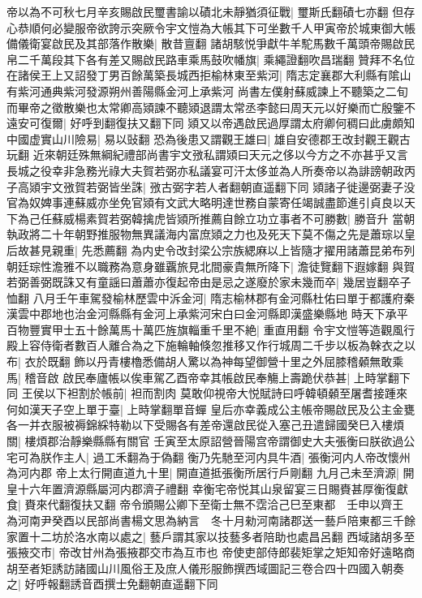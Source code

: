 帝以為不可秋七月辛亥賜啟民璽書諭以磧北未靜猶須征戰|{
	璽斯氏翻磧七亦翻}
但存心恭順何必變服帝欲誇示突厥令宇文愷為大帳其下可坐數千人甲寅帝於城東御大帳備儀衛宴啟民及其部落作散樂|{
	散昔亶翻}
諸胡駭悦爭獻牛羊駝馬數千萬頭帝賜啟民帛二千萬段其下各有差又賜啟民路車乘馬鼓吹幡旗|{
	乘繩證翻吹昌瑞翻}
贊拜不名位在諸侯王上又詔發丁男百餘萬築長城西拒榆林東至紫河|{
	隋志定襄郡大利縣有隂山有紫河通典紫河發源朔州善陽縣金河上承紫河}
尚書左僕射蘇威諫上不聽築之二旬而畢帝之徵散樂也太常卿高熲諫不聽熲退謂太常丞李懿曰周天元以好樂而亡殷鑒不遠安可復爾|{
	好呼到翻復扶又翻下同}
熲又以帝遇啟民過厚謂太府卿何稠曰此虜頗知中國虚實山川險易|{
	易以䜴翻}
恐為後患又謂觀王雄曰|{
	雄自安德郡王改封觀王觀古玩翻}
近來朝廷殊無綱紀禮部尚書宇文㢸私謂熲曰天元之侈以今方之不亦甚乎又言長城之役幸非急務光祿大夫賀若弼亦私議宴可汗太侈並為人所奏帝以為誹謗朝政丙子高熲宇文㢸賀若弼皆坐誅|{
	㢸古弼字若人者翻朝直遥翻下同}
熲諸子徙邊弼妻子没官為奴婢事連蘇威亦坐免官熲有文武大略明達世務自蒙寄任竭誠盡節進引貞良以天下為己任蘇威楊素賀若弼韓擒虎皆熲所推薦自餘立功立事者不可勝數|{
	勝音升}
當朝執政將二十年朝野推服物無異議海内富庶熲之力也及死天下莫不傷之先是蕭琮以皇后故甚見親重|{
	先悉薦翻}
為内史令改封梁公宗族緦麻以上皆隨才擢用諸蕭昆弟布列朝廷琮性澹雅不以職務為意身雖覊旅見北間豪貴無所降下|{
	澹徒覽翻下遐嫁翻}
與賀若弼善弼既誅又有童謡曰蕭蕭亦復起帝由是忌之遂廢於家未幾而卒|{
	幾居豈翻卒子恤翻}
八月壬午車駕發榆林歷雲中泝金河|{
	隋志榆林郡有金河縣杜佑曰單于都護府秦漢雲中郡地也治金河縣縣有金河上承紫河宋白曰金河縣即漢盛樂縣地}
時天下承平百物豐實甲士五十餘萬馬十萬匹旌旗輜重千里不絶|{
	重直用翻}
令宇文愷等造觀風行殿上容侍衛者數百人離合為之下施輪軸倏忽推移又作行城周二千步以板為榦衣之以布|{
	衣於既翻}
飾以丹青樓櫓悉備胡人驚以為神每望御營十里之外屈膝稽顙無敢乘馬|{
	稽音啟}
啟民奉廬帳以俟車駕乙酉帝幸其帳啟民奉觴上壽跪伏恭甚|{
	上時掌翻下同}
王侯以下袒割於帳前|{
	袒而割肉}
莫敢仰視帝大悦賦詩曰呼韓頓顙至屠耆接踵來何如漢天子空上單于臺|{
	上時掌翻單音蟬}
皇后亦幸義成公主帳帝賜啟民及公主金甕各一并衣服被褥錦綵特勒以下受賜各有差帝還啟民從入塞己丑遣歸國癸巳入樓煩關|{
	樓煩郡治靜樂縣縣有關官}
壬寅至太原詔營晉陽宫帝謂御史大夫張衡曰朕欲過公宅可為朕作主人|{
	過工禾翻為于偽翻}
衡乃先馳至河内具牛酒|{
	張衡河内人帝改懷州為河内郡}
帝上太行開直道九十里|{
	開直道抵張衡所居行戶剛翻}
九月己未至濟源|{
	開皇十六年置濟源縣屬河内郡濟子禮翻}
幸衡宅帝悦其山泉留宴三日賜賚甚厚衡復獻食|{
	賚來代翻復扶又翻}
帝令頒賜公卿下至衛士無不霑洽己巳至東都　壬申以齊王為河南尹癸酉以民部尚書楊文思為納言　冬十月勑河南諸郡送一藝戶陪東都三千餘家置十二坊於洛水南以處之|{
	藝戶謂其家以技藝多者陪助也處昌呂翻}
西域諸胡多至張掖交市|{
	帝改甘州為張掖郡交市為互市也}
帝使吏部侍郎裴矩掌之矩知帝好遠略商胡至者矩誘訪諸國山川風俗王及庶人儀形服飾撰西域圖記三卷合四十四國入朝奏之|{
	好呼報翻誘音酉撰士免翻朝直遥翻下同}
